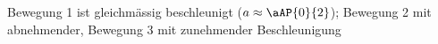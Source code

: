 Bewegung 1 ist gleichmässig beschleunigt ($a \approx \aAP{0}{2}$); Bewegung 2 mit abnehmender, Bewegung 3 mit zunehmender Beschleunigung
